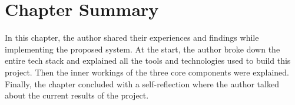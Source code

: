 \section{Chapter Summary}

In this chapter, the author shared their experiences and findings while implementing the proposed system. At the start, the author broke down the entire tech stack and explained all the tools and technologies used to build this project. Then the inner workings of the three core components were explained. Finally, the chapter concluded with a self-reflection where the author talked about the current results of the project.